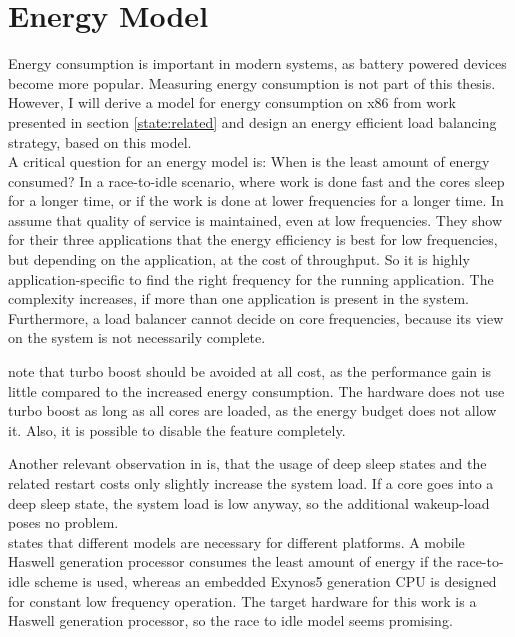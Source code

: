 \section{Energy Model}
\label{design:energy}

Energy consumption is important in modern systems, as battery powered devices
become more popular.
Measuring energy consumption is not part of this thesis.
However, I will derive a model for energy consumption on x86 from work presented
in section \ref{state:related} and design an energy efficient load balancing
strategy, based on this model.
\\

A critical question for an energy model is:
When is the least amount of energy consumed?
In a race-to-idle scenario, where work is done fast and the cores sleep for a
longer time, or if the work is done at lower frequencies for a longer time.
In \cite{le_sueur_slow_2011} \citeauthor{le_sueur_slow_2011} assume that
quality of service is maintained, even at low frequencies.
They show for their three applications that the
energy efficiency is best for low frequencies, but depending on the
application, at the cost of throughput.
So it is highly application-specific to find the right frequency for the
running application.
The complexity increases, if more than one application is present in the
system.
Furthermore, a load balancer cannot decide on core frequencies, because its
view on the system is not necessarily complete.

\citeauthor{le_sueur_slow_2011} note that turbo boost should be avoided at
all cost, as the performance gain is little compared to the increased energy
consumption.
The hardware does not use turbo boost as long as all cores are loaded, as the
energy budget does not allow it.
Also, it is possible to disable the feature completely.


Another relevant observation in \cite{le_sueur_slow_2011} is, that the usage
of deep sleep states and the related restart costs only slightly increase the
system load.
If a core goes into a deep sleep state, the system load is low anyway, so the
additional wakeup-load poses no problem.
\\

\cite{imes_poet_2015} states that different models are necessary for different
platforms.
A mobile Haswell generation processor consumes the least amount of energy if
the race-to-idle scheme is used, whereas an embedded Exynos5 generation CPU is
designed for constant low frequency operation.
The target hardware for this work is a Haswell generation processor, so the
race to idle model seems promising.
\\

